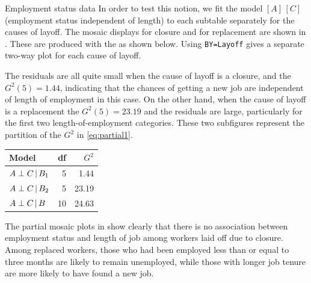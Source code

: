 \begin{Example}[employ]{Employment status data}
In order to test this notion, we fit the model $[A] \, [C]$
(employment status independent of length)
to each subtable separately for the causes of layoff.
The mosaic displays for closure and for replacement are
shown in .
These are produced with the  as shown below.
Using \texttt{BY=Layoff} gives a separate two-way plot for
each cause of layoff.


The residuals are all quite small when the cause of layoff
is a closure, and the $G^2 (5) = 1.44$, indicating 
that the chances of getting a new job are independent
of length of employment in this case.
On the other hand, when the cause of layoff is a replacement
the $G^2 (5) = 23.19$
and the residuals are large, particularly for the first
two length-of-employment categories.
These two subfigures represent the partition of the $G^2$
in \eqref{eq:partial1}.
\medskip
\begin{center}
\begin{tabular}{lrr}
 \hline
Model   &      df  &  \(G^2\) \\
 \hline
 $A \perp C \, | \, B_1$  &  5   &   1.44 \\
 $A \perp C \, | \, B_2$  &  5   &  23.19 \\
 \hline
 $A \perp C \, | \, B$    &  10  &  24.63 \\
\end{tabular}
\end{center}
The partial mosaic plots in  show clearly that
there is no association between employment status and length of
job among workers laid off due to closure.
Among replaced workers, those who had been employed less than or
equal to three months are likely to remain unemployed, while those
with longer job tenure are more likely to have found a new job.
\end{Example}